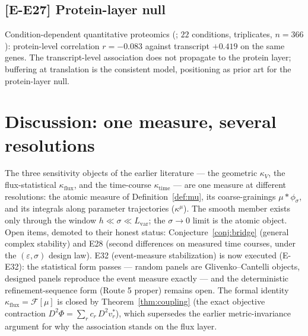 \documentclass[11pt,a4paper]{article}
\theoremstyle{plain}
\theoremstyle{definition}
\theoremstyle{remark}
\newcommand{\kk}{\kappa_{\!V}}
\newcommand{\kmu}{\kappa^{\mu}}
\begin{document}
\subsection{[E-E27] Protein-layer null}
Condition-dependent quantitative proteomics (\citet{schmidt2016}; $22$ conditions, triplicates,
$n = 366$): protein-level correlation $r = -0.083$ against transcript
$+0.419$ on the same genes. The transcript-level association does not
propagate to the protein layer; buffering at translation is the consistent
model, positioning \citet{kochanowski2013} as prior art for the protein-layer
null.

\section{Discussion: one measure, several resolutions}
\label{sec:discussion}

The three sensitivity objects of the earlier literature --- the geometric
$\kk$, the flux-statistical $\kappa_{\mathrm{flux}}$, and the time-course
$\kappa_{\mathrm{time}}$ --- are one measure at different resolutions: the
atomic measure of Definition~\ref{def:mu}, its coarse-grainings
$\mu * \phi_\sigma$, and its integrals along parameter trajectories
($\kmu$). The smooth member exists only through the window
$h \ll \sigma \ll L_{\mathrm{var}}$; the $\sigma \to 0$ limit is the
atomic object. Open items, demoted to their honest status:
Conjecture~\ref{conj:bridge} (general complex stability) and E28
(second differences on measured time courses, under the
$(\varepsilon, \sigma)$ design law). E32 (event-measure
stabilization) is now executed (E-E32): the statistical form passes
--- random panels are Glivenko--Cantelli objects, designed panels
reproduce the event measure exactly --- and the deterministic
refinement-sequence form (Route 5 proper) remains open.
The formal identity $\kappa_{\mathrm{flux}} = \mathcal{F}[\mu]$ is closed by
Theorem~\ref{thm:coupling} (the exact objective contraction
$D^2\Phi = \sum_r c_r\, D^2 v^*_r$), which supersedes the earlier
metric-invariance argument for why the association stands on the flux
layer.
\end{document}
